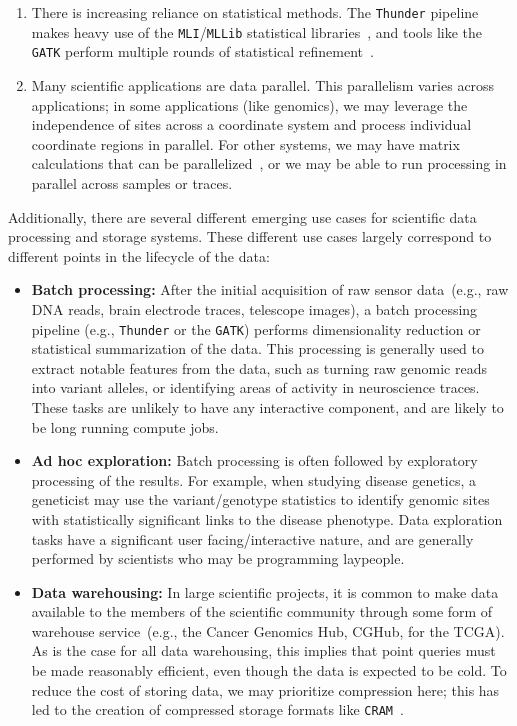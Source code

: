 \documentclass{sig-alternate}
\begin{document}
\begin{enumerate}
\item There is increasing reliance on statistical methods. The \texttt{Thunder} pipeline makes heavy use
of the \texttt{MLI}/\texttt{MLLib} statistical libraries~\cite{freeman14, sparks13}, and tools like the \texttt{GATK} perform
multiple rounds of statistical refinement~\cite{depristo11}.
\item Many scientific applications are data parallel. This parallelism varies across applications; in some applications (like
genomics), we may leverage the independence of sites across a coordinate system and process
individual coordinate regions in parallel. For other systems, we may have matrix calculations that can
be parallelized~\cite{sparks13}, or we may be able to run processing in parallel across samples or traces.
\end{enumerate}

Additionally, there are several different emerging use cases for scientific data processing and storage
systems. These different use cases largely correspond to different points in the lifecycle of the data:

\begin{itemize}
\item \textbf{Batch processing:} After the initial acquisition of raw sensor data~(e.g., raw DNA reads,
brain electrode traces, telescope images), a batch processing pipeline (e.g., \texttt{Thunder} or
the \texttt{GATK}) performs dimensionality reduction or statistical summarization of the data. This processing is
generally used to extract notable features from the data, such as turning raw genomic reads into variant
alleles, or identifying areas of activity in neuroscience traces. These tasks are unlikely to have any
interactive component, and are likely to be long running compute jobs.
\item \textbf{Ad hoc exploration:} Batch processing is often followed by
exploratory processing of the results. For example, when studying disease genetics, a geneticist may
use the variant/genotype statistics to identify genomic sites with statistically significant links to the
disease phenotype. Data exploration tasks have a significant user facing/interactive nature, and are
generally performed by scientists who may be programming laypeople.
\item \textbf{Data warehousing:} In large scientific projects, it is common to make data available to the
members of the scientific community through some form of warehouse service~(e.g., the Cancer
Genomics Hub, CGHub, for the TCGA). As is the case for all data warehousing, this implies that point queries
must be made reasonably efficient, even though the data is expected to be cold. To reduce the cost of
storing data, we may prioritize compression here; this has led to the creation of compressed storage
formats like \texttt{CRAM}~\cite{fritz11}.
\end{itemize}
\end{document}
